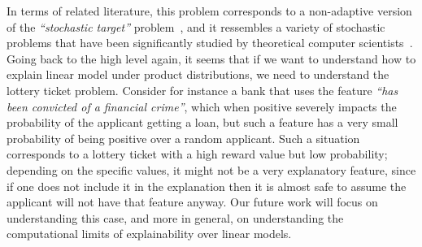 In terms of related literature, this problem corresponds to a non-adaptive version of the \emph{``stochastic target''} problem~\citep{stochasticTarget}, and it ressembles a variety of stochastic problems that have been significantly studied by theoretical computer scientists~\citep{segev2023efficientapproximationschemesstochastic,ghuge2023nonadaptivestochasticscoreclassification,deanApproximatingStochasticKnapsack2008}. 
Going back to the high level again, it seems that if we want to understand how to explain linear model under product distributions, we need to understand the lottery ticket problem. Consider for instance a bank that uses the feature \emph{``has been convicted of a financial crime''}, which when positive severely impacts the probability of the applicant getting a loan, but such a feature has a very small probability of being positive over a random applicant. Such a situation corresponds to a lottery ticket with a high reward value but low probability; depending on the specific values, it might not be a very explanatory feature, since if one does not include it in the explanation then it is almost safe to assume the applicant will not have that feature anyway. Our future work will focus on understanding this case, and more in general, on understanding the computational limits of explainability over linear models.